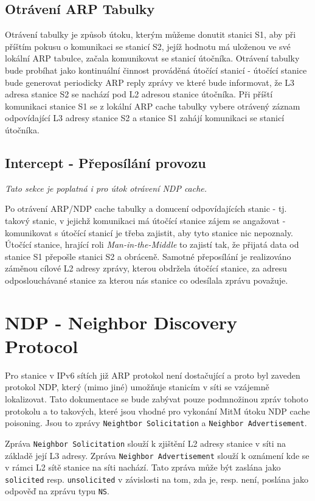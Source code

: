 \documentclass[a4paper, 11pt]{article}
\begin{document}
\subsection{Otrávení ARP Tabulky}
\indent\par{Otrávení tabulky je způsob útoku, kterým můžeme donutit stanici S1, aby při příštím pokusu o komunikaci se stanicí S2, jejíž hodnotu má uloženou ve své lokální ARP tabulce, začala komunikovat se stanicí útočníka. Otrávení tabulky bude probíhat jako kontinuální činnost prováděná útočící stanicí \-- útočící stanice bude generovat periodicky ARP reply zprávy ve které bude informovat, že L3 adresa stanice S2 se nachází pod L2 adresou stanice útočníka. Při příští komunikaci stanice S1 se z lokální ARP cache tabulky vybere otrávený záznam odpovídající L3 adresy stanice S2 a stanice S1 zahájí komunikaci se stanicí útočníka.}

\subsection{Intercept \-- Přeposílání provozu}
\indent\par{\textit{Tato sekce je poplatná i pro útok otrávení NDP cache.}}
\par{Po otrávení ARP/NDP cache tabulky a donucení odpovídajících stanic \-- tj. takový stanic, v jejichž komunikaci má útočící stanice zájem se angažovat \-- komunikovat s útočící stanicí je třeba zajistit, aby tyto stanice nic nepoznaly. Útočící stanice, hrající roli \textit{Man-in-the-Middle} to zajistí tak, že přijatá data od stanice S1 přepošle stanici S2 a obráceně. Samotné přeposílání je realizováno záměnou cílové L2 adresy zprávy, kterou obdržela útočící stanice, za adresu odposlouchávané stanice za kterou nás stanice co odesílala zprávu považuje.}

\section{NDP \-- Neighbor Discovery Protocol}
\indent\par{Pro stanice v IPv6 sítích již ARP protokol není dostačující a proto byl zaveden protokol NDP, který (mimo jiné) umožňuje stanicím v síti se vzájemně lokalizovat. Tato dokumentace se bude zabývat pouze podmnožinou zpráv tohoto protokolu a to takových, které jsou vhodné pro vykonání MitM útoku NDP cache poisoning. Jsou to zprávy  \texttt{Neightbor Solicitation} a \texttt{Neighbor Advertisement}.}

\par{Zpráva \texttt{Neighbor Solicitation} slouží k zjištění L2 adresy stanice v síti na základě její L3 adresy. Zpráva \texttt{Neighbor Advertisement} slouží k oznámení kde se v rámci L2 sítě stanice na síti nachází. Tato zpráva může být zaslána jako \texttt{solicited} resp. \texttt{unsolicited} v závislosti na tom, zda je, resp. není, poslána jako odpověď na zprávu typu \texttt{NS}.}
\end{document}
